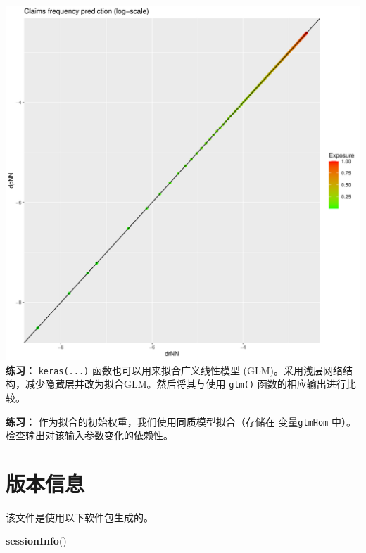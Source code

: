 \documentclass[
]{article}
\newenvironment{Shaded}{\begin{snugshade}}{\end{snugshade}}
\newcommand{\FunctionTok}[1]{\textcolor[rgb]{0.13,0.29,0.53}{\textbf{#1}}}
\newcommand{\NormalTok}[1]{#1}
\begin{document}
\includegraphics{freMTPLfreq_fnn-zh-cn_files/figure-latex/unnamed-chunk-75-1.pdf}
\textbf{练习：} \texttt{keras(...)} 函数也可以用来拟合广义线性模型
(GLM)。采用浅层网络结构，减少隐藏层并改为拟合GLM。然后将其与使用
\texttt{glm()} 函数的相应输出进行比较。

\textbf{练习：} 作为拟合的初始权重，我们使用同质模型拟合（存储在
变量\texttt{glmHom} 中）。检查输出对该输入参数变化的依赖性。

\section{版本信息}\label{ux7248ux672cux4fe1ux606f}

该文件是使用以下软件包生成的。

\begin{Shaded}
\begin{Highlighting}[]
\FunctionTok{sessionInfo}\NormalTok{()}
\end{Highlighting}
\end{Shaded}
\end{document}
